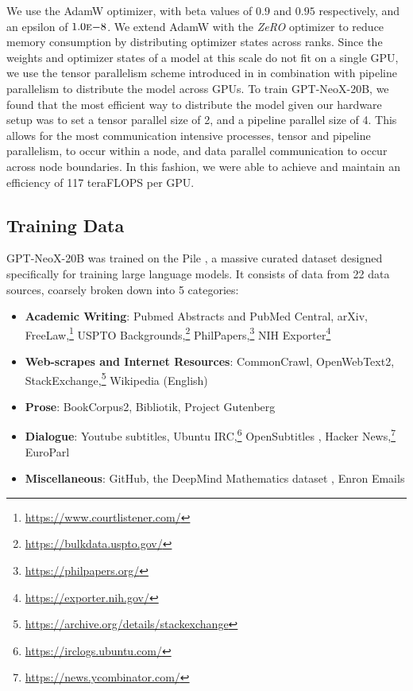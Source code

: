 \documentclass[11pt]{article}
\newcommand{\model}{GPT-NeoX-20B}
\begin{document}
We use the AdamW \citep{loshchilov2019decoupled} optimizer, with beta values of $0.9$ and $0.95$ respectively, and an epsilon of $1.0\mathrm{\textsc{e}}{-8}$. We extend AdamW with the \textit{ZeRO} optimizer \citep{rajbhandari2020zero} to reduce memory consumption by distributing optimizer states across ranks. Since the weights and optimizer states of a model at this scale do not fit on a single GPU, we use the tensor parallelism scheme introduced in \citet{shoeybi2020megatronlm} in combination with pipeline parallelism \citep{harlap2018pipedream} to distribute the model across GPUs. To train \model{}, we found that the most efficient way to distribute the model given our hardware setup was to set a tensor parallel size of 2, and a pipeline parallel size of 4. This allows for the most communication intensive processes, tensor and pipeline parallelism, to occur within a node, and data parallel communication to occur across node boundaries. In this fashion, we were able to achieve and maintain an efficiency of 117 teraFLOPS per GPU.

\subsection{Training Data}
\label{sec:training-data}

\model{} was trained on the Pile \citep{gao2020pile}, a massive curated dataset designed specifically for training large language models. It consists of data from 22 data sources, coarsely broken down into 5 categories:

\begin{itemize}
    \item \textbf{Academic Writing}: Pubmed Abstracts and PubMed Central, arXiv, FreeLaw,\footnote{\url{https://www.courtlistener.com/}} USPTO Backgrounds,\footnote{\url{https://bulkdata.uspto.gov/}} PhilPapers,\footnote{\url{https://philpapers.org/}} NIH Exporter\footnote{\url{https://exporter.nih.gov/}}
    \item \textbf{Web-scrapes and Internet Resources}: CommonCrawl, OpenWebText2, StackExchange,\footnote{\url{https://archive.org/details/stackexchange}} Wikipedia (English)
    \item \textbf{Prose}: BookCorpus2, Bibliotik, Project Gutenberg \citep[PG-19;][]{rae2019compressive}
    \item \textbf{Dialogue}: Youtube subtitles, Ubuntu IRC,\footnote{\url{https://irclogs.ubuntu.com/}} OpenSubtitles \citep{lison-tiedemann-2016-opensubtitles2016}, Hacker News,\footnote{\url{https://news.ycombinator.com/}} EuroParl \citep{koehn-2005-europarl}
    \item \textbf{Miscellaneous}: GitHub, the DeepMind Mathematics dataset \citep{saxton2019analysing}, Enron Emails \citep{10.1007/978-3-540-30115-8_22}
\end{itemize}
\end{document}
